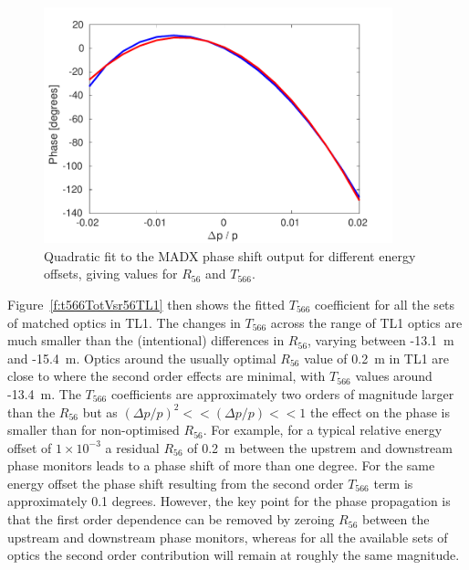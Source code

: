 \begin{figure}
  \centering
  \includegraphics[width=0.9\textwidth]{Figures/propagation/madxT566Fit}
  \caption{Quadratic fit to the MADX phase shift output for different energy offsets, giving values for \(R_{56}\) and \(T_{566}\).}
  \label{f:madxT566Fit}
\end{figure}

Figure~\ref{f:t566TotVsr56TL1} then shows the fitted \(T_{566}\) coefficient for all the sets of matched optics in TL1. The changes in \(T_{566}\) across the range of TL1 optics are much smaller than the (intentional) differences in \(R_{56}\), varying between -13.1~m and -15.4~m. Optics around the usually optimal \(R_{56}\) value of 0.2~m in TL1  are close to where the second order effects are minimal, with \(T_{566}\) values around -13.4~m. The \(T_{566}\) coefficients are approximately two orders of magnitude larger than the \(R_{56}\) but as \(\left(\Delta p / p\right)^2 << \left(\Delta p / p\right) << 1\) the effect on the phase is smaller than for non-optimised \(R_{56}\). For example, for a typical relative energy offset of \(1 \times 10^{-3}\) a residual \(R_{56}\) of 0.2~m between the upstrem and downstream phase monitors leads to a phase shift of more than one degree. For the same energy offset the phase shift resulting from the second order \(T_{566}\) term is approximately 0.1 degrees. However, the key point for the phase propagation is that the first order dependence can be removed by zeroing \(R_{56}\) between the upstream and downstream phase monitors, whereas for all the available sets of optics the second order contribution will remain at roughly the same magnitude.

